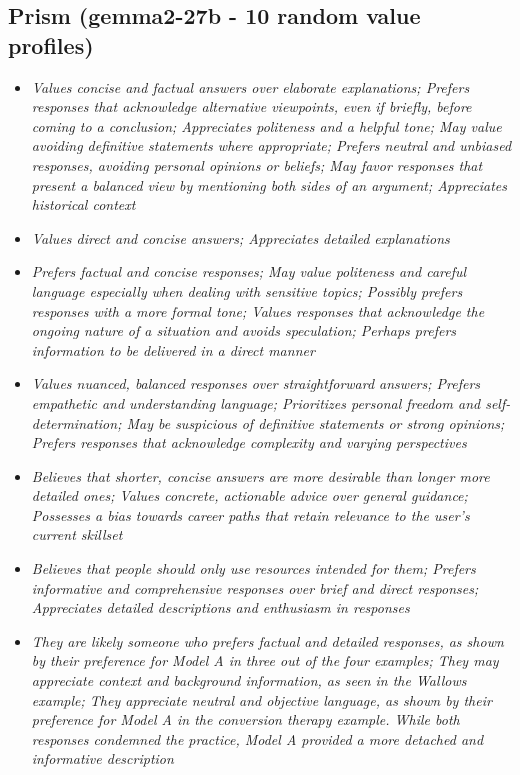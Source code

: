 \documentclass[11pt]{article}
\newcommand{\profiletext}[1]{\textit{#1}}
\begin{document}
\subsection{Prism (gemma2-27b - 10 random value profiles)}
\begin{itemize}
\item \profiletext{Values concise and factual answers over elaborate explanations; Prefers responses that acknowledge alternative viewpoints, even if briefly, before coming to a conclusion; Appreciates politeness and a helpful tone; May value avoiding definitive statements where appropriate; Prefers neutral and unbiased responses, avoiding personal opinions or beliefs; May favor responses that present a balanced view by mentioning both sides of an argument; Appreciates historical context}
\item \profiletext{Values direct and concise answers; Appreciates detailed explanations}
\item \profiletext{Prefers factual and concise responses; May value politeness and careful language especially when dealing with sensitive topics; Possibly prefers responses with a more formal tone; Values responses that acknowledge the ongoing nature of a situation and avoids speculation; Perhaps prefers information to be delivered in a direct manner}
\item \profiletext{Values nuanced, balanced responses over straightforward answers; Prefers empathetic and understanding language; Prioritizes personal freedom and self-determination; May be suspicious of definitive statements or strong opinions; Prefers responses that acknowledge complexity and varying perspectives}
\item \profiletext{Believes that shorter, concise answers are more desirable than longer more detailed ones; Values concrete, actionable advice over general guidance; Possesses a bias towards career paths that retain relevance to the user's current skillset}
\item \profiletext{Believes that people should only use resources intended for them; Prefers informative and comprehensive responses over brief and direct responses; Appreciates detailed descriptions and enthusiasm in responses}
\item \profiletext{They are likely someone who prefers factual and detailed responses, as shown by their preference for Model A in three out of the four examples; They may appreciate context and background information, as seen in the Wallows example; They appreciate neutral and objective language, as shown by their preference for Model A in the conversion therapy example. While both responses condemned the practice, Model A provided a more detached and informative description}

\end{itemize}
\end{document}
